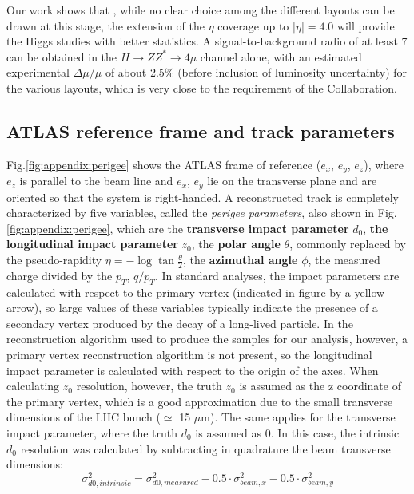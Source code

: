 \documentclass[a4paper,twoside,12pt]{book}
\begin{document}
Our work shows that , while no clear choice among the different layouts can be drawn at this stage, the extension of the $\eta$ coverage up to $|\eta| = 4.0$ will provide the Higgs studies with better statistics. A signal-to-background radio of at least 7 can be obtained in the $H \rightarrow ZZ^{*} \rightarrow 4\mu$ channel alone, with an estimated experimental $\Delta\mu/\mu$ of about 2.5\%  (before inclusion of luminosity uncertainty) for the various layouts, which is very close to the requirement of the Collaboration.

\clearpage

\begin{appendices}
\chapter{ATLAS reference frame and track parameters} \label{appendix:perigee}

Fig.\ref{fig:appendix:perigee} shows the ATLAS frame of reference ($e_{x}$, $e_{y}$, $e_{z}$), where $e_{z}$ is parallel to the beam line and $e_{x}$, $e_{y}$ lie on the
transverse plane and are oriented so that the system is right-handed. A reconstructed track is completely characterized by five variables, called the \textit{perigee parameters}, also shown in
Fig.\ref{fig:appendix:perigee}, which are the \textbf{transverse impact parameter} $d_{0}$, \textbf{the longitudinal impact parameter} $z_{0}$, the \textbf{polar angle} $\theta$, commonly replaced by the 
pseudo-rapidity $\eta = -\log{\tan{\frac{\theta}{2}}}$, the \textbf{azimuthal angle} $\phi$, the measured charge divided by the $p_{T}$, {\boldmath$q/p_{T}$}. In standard analyses, the impact parameters are calculated with respect to the primary vertex (indicated in figure by a yellow arrow), so large values of these variables typically indicate the presence of a secondary 
vertex produced by the decay of a long-lived particle. In the reconstruction algorithm used to produce the samples for our analysis, however, a primary vertex reconstruction algorithm is not present, so the longitudinal impact parameter is calculated with 
respect to the origin of the axes. When calculating $z_{0}$ resolution, however, the truth $z_{0}$ is assumed as the z coordinate of the primary vertex, which is a
good approximation due to the small transverse dimensions of the LHC bunch ($\simeq$ 15 $\mu$m). The same applies for the transverse impact parameter, where the 
truth $d_{0}$ is assumed as 0. In this case, the intrinsic $d_{0}$ resolution was calculated by subtracting in quadrature the beam transverse dimensions:
\begin{equation*}
\text{$\sigma_{d0, intrinsic}^{2} = \sigma_{d0, measured}^{2} - 0.5 \cdot \sigma_{beam, x}^{2} - 0.5 \cdot \sigma_{beam, y}^{2}$}
\end{equation*}


\end{appendices}
\end{document}
